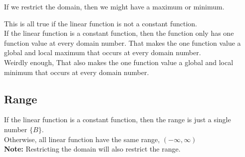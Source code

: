 \documentclass{ximera}
\begin{document}
If we restrict the domain, then we might have a maximum or minimum. \\



\begin{warning}

This is all true if the linear function is not a constant function. \\


If the linear function is a constant function, then the function only has one function value at every domain number.  That makes the one function value a global and local maximum that occurs at every domain number. \\

Weirdly enough, That also makes the one function value a global and local minimum that occurs at every domain number.

\end{warning}



\subsection*{Range}


If the linear function is a constant function, then the range is just a single number $\{ B \}$. \\

Otherwise, all linear function have the same range, $(-\infty, \infty)$ \\

\textbf{Note:} Restricting the domain will also restrict the range.\\
\end{document}
